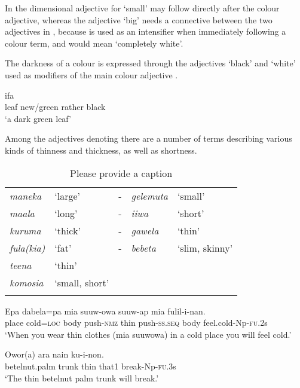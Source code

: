 In  the dimensional adjective for `small' may follow directly after the colour adjective, whereas the adjective  `big' needs a connective between the two adjectives in , because  is used as an intensifier when immediately following a colour term, and  would mean `completely white'.

The darkness of a colour is expressed through the adjectives  `black' and  `white' used as modifiers of the main colour adjective .

\ea%
\label{ex:3:x110}
\gll ifa    \\
leaf new/green rather black\\
\glt`a dark green leaf'
\z

Among the adjectives denoting  there are a number of terms describing various kinds of thinness and thickness, as well as shortness. 

\begin{table}
\caption{Please provide a caption}
\label{} 
\begin{tabular}{>{\itshape}llc>{\itshape}ll}
\mytoprule
maneka &`large' &- &gelemuta &`small'\\
maala &`long' &- &iiwa &`short'\\
kuruma &`thick' &- &gawela &`thin'\\
fula(kia) &`fat' &- &bebeta &`slim, skinny'\\
teena &`thin'&&&\\
komosia &`small, short'&&&\\
\mybottomrule
\end{tabular}
\end{table}

\ea%
\label{ex:3:x1756}
\gll Epa dabela=pa mia suuw-owa  suuw-ap mia fulil-i-nan.\\
place cold=\textsc{loc} body push-\textsc{nmz} thin push-\textsc{ss}.\textsc{seq} body feel.cold-Np-\textsc{fu}.2s\\
\glt`When you wear thin clothes (mia suuwowa) in a cold place you will feel cold.' 
\z

\ea%
\label{ex:3:x76}
\gll Owor(a) ara   nain ku-i-non. \\
betelnut.palm trunk thin that1 break-Np-\textsc{fu}.3s\\
\glt`The thin betelnut palm trunk will break.'
\z


